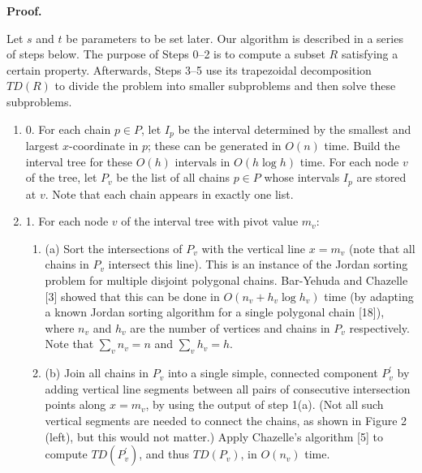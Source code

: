 \documentclass[10pt,a4paper]{article}
\begin{document}
\par\medskip\noindent\textbf{Proof.}\par
Let $s$ and $t$ be parameters to be set later. Our algorithm is described in a series of steps below. The purpose of Steps 0–2 is to compute a subset $R$ satisfying a certain property. Afterwards, Steps 3–5 use its trapezoidal decomposition $\textit{TD}(R)$ to divide the problem into smaller subproblems and then solve these subproblems.
\par
\par
\begin{enumerate}
\item[]  0. 
For each chain $p\in P$, let $I_{p}$ be the interval determined by the smallest and largest $x$-coordinate in $p$; these can be generated in $O(n)$ time. Build the interval tree for these $O(h)$ intervals in $O(h\log h)$ time. For each node $v$ of the tree, let $P_{v}$ be the list of all chains $p\in P$ whose intervals $I_{p}$ are stored at $v$. Note that each chain appears in exactly one list.
\par
\par
\item[]  1. 
For each node $v$ of the interval tree with pivot value $m_{v}$:
\par
\begin{enumerate}
\item[]  (a) 
Sort the intersections of $P_{v}$ with the vertical line $x=m_{v}$ (note that all chains in $P_{v}$ intersect this line). This is an instance of the Jordan sorting problem for multiple disjoint polygonal chains. Bar-Yehuda and Chazelle [3] showed that this can be done in $O(n_{v}+h_{v}\log h_{v})$ time (by adapting a known Jordan sorting algorithm for a single polygonal chain [18]), where $n_{v}$ and $h_{v}$ are the number of vertices and chains in $P_{v}$ respectively. Note that $\sum_{v}n_{v}=n$ and $\sum_{v}h_{v}=h$.
\par
\par
\item[]  (b) 
Join all chains in $P_{v}$ into a single simple, connected component $P^{\prime}_{v}$ by adding vertical line segments between all pairs of consecutive intersection points along $x=m_{v}$, by using the output of step 1(a). (Not all such vertical segments are needed to connect the chains, as shown in Figure 2 (left), but this would not matter.) Apply Chazelle’s algorithm [5] to compute $\textit{TD}(P^{\prime}_{v})$, and thus $\textit{TD}(P_{v})$, in $O(n_{v})$ time.

\end{enumerate}
\end{enumerate}
\end{document}
